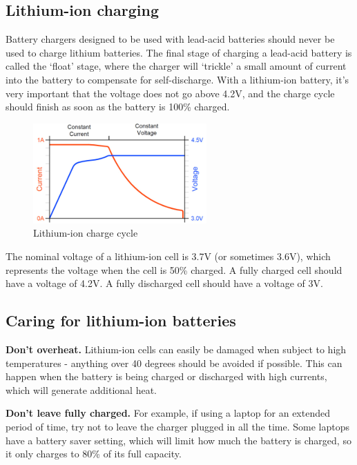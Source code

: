 \documentclass{article}
\theoremstyle{definition}
\theoremstyle{definition}
\theoremstyle{remark}
\begin{document}

  \subsection{Lithium-ion charging} %
  \label{sub:lithium_ion_charging}

    Battery chargers designed to be used with lead-acid batteries should never be used to charge lithium batteries. The final stage of charging a lead-acid battery is called the ‘float’ stage, where the charger will ‘trickle’ a small amount of current into the battery to compensate for self-discharge. With a lithium-ion battery, it’s very important that the voltage does not go above 4.2V, and the charge cycle should finish as soon as the battery is 100\% charged.

    \begin{figure}[!ht]
      \centering
      \includegraphics[]{Images/image_4_1_(charge_cycle).png}
      \caption*{\centering Lithium-ion charge cycle}
    \end{figure}

    The nominal voltage of a lithium-ion cell is 3.7V (or sometimes 3.6V), which represents the voltage when the cell is 50\% charged. A fully charged cell should have a voltage of 4.2V. A fully discharged cell should have a voltage of 3V.


  \subsection{Caring for lithium-ion batteries} %
  \label{sub:caring_for_lithium_ion_batteries}

    \textbf{Don’t overheat.} Lithium-ion cells can easily be damaged when subject to high temperatures - anything over 40 degrees should be avoided if possible. This can happen when the battery is being charged or discharged with high currents, which will generate additional heat.

    \textbf{Don’t leave fully charged.} For example, if using a laptop for an extended period of time, try not to leave the charger plugged in all the time. Some laptops have a battery saver setting, which will limit how much the battery is charged, so it only charges to 80\% of its full capacity. 
\end{document}
